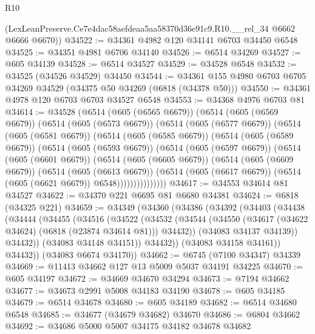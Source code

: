 \begin{lexlean}{R10}
\begin{coremodule}
      (LexLeanPreserve.Ce7e4dac58aefdeaa5aa58370d36e91c9.R10.__rel_34 @6662 @6666 @6670))
@34522 := @34361 @4982 @120 @34141 @6703 @34450 @6548
@34525 := @34351 @4981 @6706 @34140
@34526 := @6514 @34269
@34527 := @605 @34139
@34528 := @6514 @34527
@34529 := @34528 @6548
@34532 := @34525 (@34526 @34529) @34450
@34544 := @34361 @155 @4980 @6703 @6705 @34269 @34529 (@34375 @50 @34269 (@6818 (@34378 @50)))
@34550 := @34361 @4978 @120 @6703 @6703 @34527 @6548
@34553 := @34368 @4976 @6703 @81
@34614 := @34528
    (@6514
      (@605 (@6565 @6679))
      (@6514
        (@605 (@6569 @6679))
        (@6514
          (@605 (@6573 @6679))
          (@6514
            (@605 (@6577 @6679))
            (@6514
              (@605 (@6581 @6679))
              (@6514
                (@605 (@6585 @6679))
                (@6514
                  (@605 (@6589 @6679))
                  (@6514
                    (@605 (@6593 @6679))
                    (@6514
                      (@605 (@6597 @6679))
                      (@6514
                        (@605 (@6601 @6679))
                        (@6514
                          (@605 (@6605 @6679))
                          (@6514
                            (@605 (@6609 @6679))
                            (@6514
                              (@605 (@6613 @6679))
                              (@6514
                                (@605 (@6617 @6679))
                                (@6514 (@605 (@6621 @6679)) @6548)))))))))))))))
@34617 := @34553 @34614 @81 @34527
@34622 := @34370 @221 @6695 @81 @6680 @34381
@34624 := @6818 (@34325 @221)
@34659 := @34349
    (@34360
      (@34386
        (@34392
          (@34403
            (@34438
              (@34444
                (@34455
                  (@34516
                    (@34522
                      (@34532
                        (@34544
                          (@34550 (@34617 (@34622 @34624) (@6818 (@23874 @34614 @81))) @34432))
                        (@34083 @34137 @34139))
                      @34432))
                  (@34083 @34148 @34151))
                @34432))
            (@34083 @34158 @34161))
          @34432))
      (@34083 @6674 @34170))
@34662 := @6745 (@7100 @34347) @34339
@34669 := @11413 @34662 @127 @13 @5009 @5037 @34191 @34225
@34670 := @605 @34197
@34672 := @34669 @34670 @34294
@34673 := @7194 @34662
@34677 := @34673 @2991 @5008 @34183 @34190
@34678 := @605 @34185
@34679 := @6514 @34678
@34680 := @605 @34189
@34682 := @6514 @34680 @6548
@34685 := @34677 (@34679 @34682) @34670
@34686 := @6804 @34662
@34692 := @34686 @5000 @5007 @34175 @34182 @34678 @34682

\end{coremodule}
\end{lexlean}
